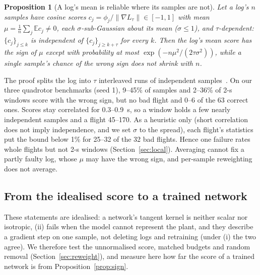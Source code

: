 \documentclass[preprint,12pt]{elsarticle}
\newcommand{\E}{\mathbb{E}}
\newtheorem{proposition}{Proposition}
\begin{document}
\begin{proposition}[A log's mean is reliable where its samples are not]\label{prop:agg}
Let a log's $n$ samples have cosine scores $c_j=\phi_j/\|\nabla L_\tau\|\in[-1,1]$ with mean $\mu=\frac1n\sum_j\E c_j\neq0$, each $\sigma$-sub-Gaussian about its mean ($\sigma\le1$), and $\tau$-dependent: $\{c_j\}_{j\le k}$ is independent of $\{c_j\}_{j\ge k+\tau}$ for every $k$. Then the log's mean score has the sign of $\mu$ except with probability at most $\exp(-n\mu^2/(2\tau\sigma^2))$, while a single sample's chance of the wrong sign does not shrink with $n$.
\end{proposition}
The proof splits the log into $\tau$ interleaved runs of independent samples~\citep{janson2004large}. On our three quadrotor benchmarks (seed 1), 9--45\% of samples and 2--36\% of 2-s windows score with the wrong sign, but no bad flight and 0--6 of the 63 correct ones. Scores stay correlated for 0.3--0.9~s, so a window holds a few nearly independent samples and a flight 45--170. As a heuristic only (short correlation does not imply independence, and we set $\sigma$ to the spread), each flight's statistics put the bound below 1\% for 25--32 of the 32 bad flights. Hence one failure rates whole flights but not 2-s windows (Section~\ref{sec:local}). Averaging cannot fix a partly faulty log, whose $\mu$ may have the wrong sign, and per-sample reweighting~\citep{ren2018l2rw} does not average.

\subsection{From the idealised score to a trained network}\label{sec:margin}

These statements are idealised: a network's tangent kernel is neither scalar nor isotropic, (ii) fails when the model cannot represent the plant, and they describe a gradient step on one sample, not deleting logs and retraining (under (i) the two agree). We therefore test the unnormalised score, matched budgets and random removal (Section~\ref{sec:reweight}), and measure here how far the score of a trained network is from Proposition~\ref{prop:sign}.
\end{document}
